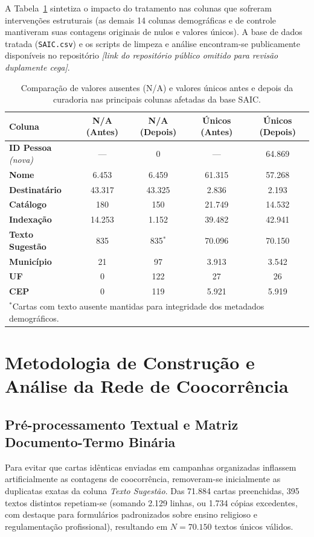 \documentclass[12pt]{article}
\newcommand{\repolink}{\textit{[link do repositório público omitido para revisão duplamente cega]}}
\begin{document}
A Tabela~\ref{tab:limpeza} sintetiza o impacto do tratamento nas colunas que sofreram intervenções estruturais (as demais 14 colunas demográficas e de controle mantiveram suas contagens originais de nulos e valores únicos). A base de dados tratada (\texttt{SAIC.csv}) e os scripts de limpeza e análise encontram-se publicamente disponíveis no repositório \repolink.

\begin{table}[htb]
\centering
\caption{Comparação de valores ausentes (N/A) e valores únicos antes e depois da curadoria nas principais colunas afetadas da base SAIC.}
\label{tab:limpeza}
\footnotesize
\begin{tabular}{lcccc}
\toprule
\textbf{Coluna} & \textbf{N/A (Antes)} & \textbf{N/A (Depois)} & \textbf{Únicos (Antes)} & \textbf{Únicos (Depois)} \\
\midrule
\textbf{ID Pessoa} \textit{(nova)} & --- & 0 & --- & 64.869 \\
\textbf{Nome} & 6.453 & 6.459 & 61.315 & 57.268 \\
\textbf{Destinatário} & 43.317 & 43.325 & 2.836 & 2.193 \\
\textbf{Catálogo} & 180 & 150 & 21.749 & 14.532 \\
\textbf{Indexação} & 14.253 & 1.152 & 39.482 & 42.941 \\
\textbf{Texto Sugestão} & 835 & 835$^*$ & 70.096 & 70.150 \\
\textbf{Município} & 21 & 97 & 3.913 & 3.542 \\
\textbf{UF} & 0 & 122 & 27 & 26 \\
\textbf{CEP} & 0 & 119 & 5.921 & 5.919 \\
\bottomrule
\multicolumn{5}{l}{\scriptsize $^*$Cartas com texto ausente mantidas para integridade dos metadados demográficos.}
\end{tabular}
\end{table}

\section{Metodologia de Construção e Análise da Rede de Coocorrência}

\subsection{Pré-processamento Textual e Matriz Documento-Termo Binária}

Para evitar que cartas idênticas enviadas em campanhas organizadas inflassem artificialmente as contagens de coocorrência, removeram-se inicialmente as duplicatas exatas da coluna \textit{Texto Sugestão}. Das 71.884 cartas preenchidas, 395 textos distintos repetiam-se (somando 2.129 linhas, ou 1.734 cópias excedentes, com destaque para formulários padronizados sobre ensino religioso e regulamentação profissional), resultando em $N = 70.150$ textos únicos válidos.
\end{document}
